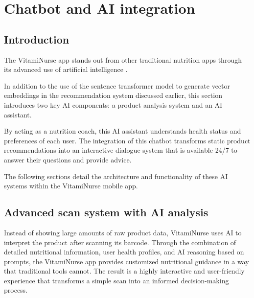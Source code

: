 

\chapter{Chatbot and AI integration}
\section*{Introduction}
The VitamiNurse app stands out from other traditional nutrition apps through its advanced use of artificial intelligence .

In addition to the use of the sentence transformer model to generate vector embeddings  in the recommendation system  discussed earlier, this section introduces two key AI components: a product analysis system and an AI assistant.

  By acting as a nutrition coach, this AI assistant understands health status and preferences of each user. The integration of this chatbot transforms static product recommendations into an interactive dialogue system that is available 24/7 to answer their questions and provide advice.

The following sections detail the architecture and functionality of these AI systems within the VitamiNurse mobile app.

\section{Advanced scan system with AI analysis }

Instead of showing large amounts of raw product data, VitamiNurse uses AI to interpret the product after scanning its barcode.  Through the combination of detailed nutritional information, user health profiles, and AI reasoning based on prompts, the VitamiNurse app provides customized nutritional guidance in a way that traditional tools cannot. The result is a highly interactive and user-friendly experience that transforms a simple scan into an informed decision-making process.

